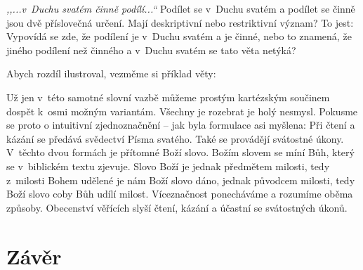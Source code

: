 \textit{,,...v~Duchu svatém činně podílí...``} Podílet se v~Duchu svatém a
podílet se činně jsou dvě příslovečná určení. Mají deskriptivní nebo
restriktivní význam? To jest: Vypovídá se zde, že podílení je v~Duchu svatém a
je činné, nebo to znamená, že jiného podílení než činného a v~Duchu svatém se
tato věta netýká?

Abych rozdíl ilustroval, vezměme si příklad věty: 

Už jen v~této samotné slovní vazbě můžeme prostým kartézským součinem dospět
k~osmi možným variantám. Všechny je rozebrat je holý nesmysl. Pokusme se proto o
intuitivní zjednoznačnění -- jak byla formulace asi myšlena: Při čtení a kázání
se předává svědectví Písma svatého. Také se provádějí svátostné úkony. V~těchto
dvou formách je přítomné Boží slovo. Božím slovem se míní Bůh, který se
v~biblickém textu zjevuje. Slovo Boží je jednak předmětem milosti, tedy
z~milosti Bohem udělené je nám Boží slovo dáno, jednak původcem milosti, tedy
Boží slovo coby Bůh udílí milost. Víceznačnost ponecháváme a rozumíme oběma
způsoby. Obecenství věřících slyší čtení, kázání a účastní se svátostných úkonů.

\vspace{15mm}
\chapter{Závěr}
\label{div:zaver}

